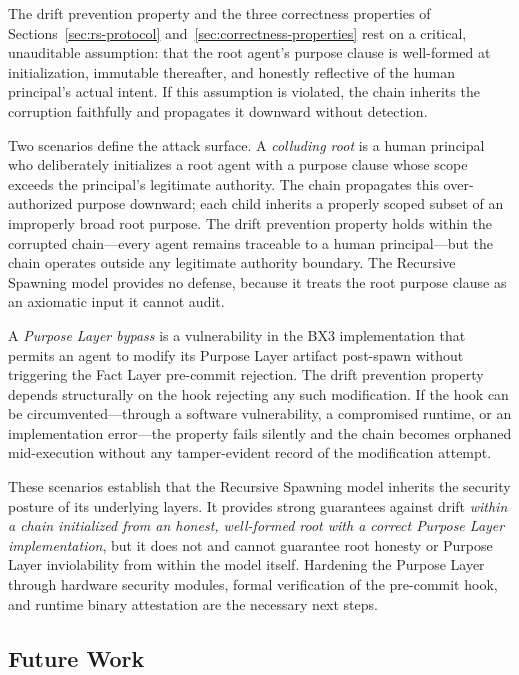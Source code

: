 The drift prevention property and the three correctness properties of Sections~\ref{sec:rs-protocol} and~\ref{sec:correctness-properties} rest on a critical, unauditable assumption: that the root agent's purpose clause is well-formed at initialization, immutable thereafter, and honestly reflective of the human principal's actual intent. If this assumption is violated, the chain inherits the corruption faithfully and propagates it downward without detection.

Two scenarios define the attack surface. A \textit{colluding root} is a human principal who deliberately initializes a root agent with a purpose clause whose scope exceeds the principal's legitimate authority. The chain propagates this over-authorized purpose downward; each child inherits a properly scoped subset of an improperly broad root purpose. The drift prevention property holds within the corrupted chain---every agent remains traceable to a human principal---but the chain operates outside any legitimate authority boundary. The Recursive Spawning model provides no defense, because it treats the root purpose clause as an axiomatic input it cannot audit.

A \textit{Purpose Layer bypass} is a vulnerability in the BX3 implementation that permits an agent to modify its Purpose Layer artifact post-spawn without triggering the Fact Layer pre-commit rejection. The drift prevention property depends structurally on the hook rejecting any such modification. If the hook can be circumvented---through a software vulnerability, a compromised runtime, or an implementation error---the property fails silently and the chain becomes orphaned mid-execution without any tamper-evident record of the modification attempt.

These scenarios establish that the Recursive Spawning model inherits the security posture of its underlying layers. It provides strong guarantees against drift \emph{within a chain initialized from an honest, well-formed root with a correct Purpose Layer implementation}, but it does not and cannot guarantee root honesty or Purpose Layer inviolability from within the model itself. Hardening the Purpose Layer through hardware security modules, formal verification of the pre-commit hook, and runtime binary attestation are the necessary next steps.

\subsection{Future Work}
\label{sec:future}

